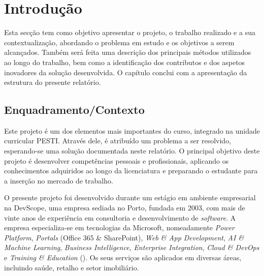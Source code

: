 % 
\chapter{Introdução} %
\label{chap:Introdução} %









Esta secção tem como objetivo apresentar o projeto, o trabalho realizado e a sua contextualização, abordando o problema em estudo e os objetivos a serem alcançados. Também será feita uma descrição dos principais métodos utilizados ao longo do trabalho, bem como a identificação dos contributos e dos aspetos inovadores da solução desenvolvida. O capítulo conclui com a apresentação da estrutura do presente relatório.


%
\section{Enquadramento/Contexto} 
\label{sec:chap1_introduction} %

Este projeto é um dos elementos mais importantes do curso, integrado na unidade curricular \gls{PESTI}. Através dele, é atribuído um problema a ser resolvido, esperando-se uma solução documentada neste relatório. O principal objetivo deste projeto é desenvolver competências pessoais e profissionais, aplicando os conhecimentos adquiridos ao longo da licenciatura e preparando o estudante para a inserção no mercado de trabalho.

O presente projeto foi desenvolvido durante um estágio em ambiente empresarial na DevScope, uma empresa sediada no Porto, fundada em 2003, com mais de vinte anos de experiência em consultoria e desenvolvimento de \textit{software}. A empresa especializa-se em tecnologias da Microsoft, nomeadamente \textit{Power Platform}, \textit{Portals} (Office 365 \& SharePoint), \textit{Web \& App Development}, \textit{AI \& Machine Learning}, \textit{Business Intelligence}, \textit{Enterprise Integration}, \textit{Cloud \& DevOps} e \textit{Training \& Education} (\cite{DevScopeSolutions}). Os seus serviços são aplicados em diversas áreas, incluindo saúde, retalho e setor imobiliário.

